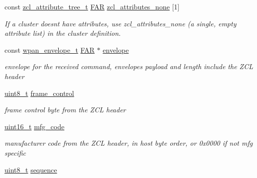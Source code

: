\begin{DoxyCompactItemize}
const \hyperlink{structzcl__attribute__tree__t}{zcl\+\_\+attribute\+\_\+tree\+\_\+t} \hyperlink{group__hal_gaef060b3456fdcc093a7210a762d5f2ed}{F\+AR} \hyperlink{group__zcl_gad1e7f7dd501a7ab02f6004e4091c6bea}{zcl\+\_\+attributes\+\_\+none} \mbox{[}1\mbox{]}
\begin{DoxyCompactList}\small\item\em If a cluster doesn\textquotesingle{}t have attributes, use zcl\+\_\+attributes\+\_\+none (a single, empty attribute list) in the cluster definition. \end{DoxyCompactList}\item 
\mbox{\label{group__zcl_ga1c24c7848d60bc6aa335a8ba9fd14b7a}} 
const \hyperlink{structwpan__envelope__t}{wpan\+\_\+envelope\+\_\+t} \hyperlink{group__hal_gaef060b3456fdcc093a7210a762d5f2ed}{F\+AR} $\ast$ \hyperlink{group__zcl_ga1c24c7848d60bc6aa335a8ba9fd14b7a}{envelope}
\begin{DoxyCompactList}\small\item\em envelope for the received command, envelope\textquotesingle{}s payload and length include the Z\+CL header \end{DoxyCompactList}\item 
\mbox{\label{group__zcl_ga5226462a41663bc81a5d67c04f18868a}} 
\hyperlink{group__hal__dos_gae1affc9ca37cfb624959c866a73f83c2}{uint8\+\_\+t} \hyperlink{group__zcl_ga5226462a41663bc81a5d67c04f18868a}{frame\+\_\+control}
\begin{DoxyCompactList}\small\item\em frame control byte from the Z\+CL header \end{DoxyCompactList}\item 
\mbox{\label{group__zcl_ga011fb17c1112658806badaccba7a246d}} 
\hyperlink{group__hal__dos_ga5a8b2dc9e45a9ee81a94ef304fb62505}{uint16\+\_\+t} \hyperlink{group__zcl_ga011fb17c1112658806badaccba7a246d}{mfg\+\_\+code}
\begin{DoxyCompactList}\small\item\em manufacturer code from the Z\+CL header, in host byte order, or 0x0000 if not mfg specific \end{DoxyCompactList}\item 
\mbox{\label{group__zcl_gacb5c8866a58116314f6c8eda9dc3544c}} 
\hyperlink{group__hal__dos_gae1affc9ca37cfb624959c866a73f83c2}{uint8\+\_\+t} \hyperlink{group__zcl_gacb5c8866a58116314f6c8eda9dc3544c}{sequence}

\end{DoxyCompactItemize}
